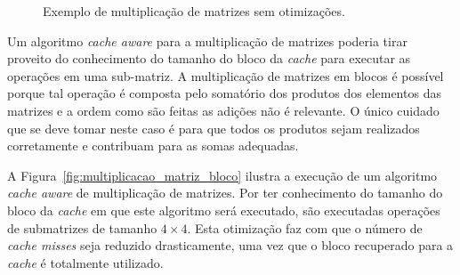 \begin{figure}[hb]
    \centering
    \caption[Exemplo de multiplicação de matrizes]{Exemplo de multiplicação de matrizes sem otimizações.}
    \label{fig:multiplicacao_matriz}
\end{figure}


Um algoritmo \textit{cache aware} para a multiplicação de matrizes poderia tirar proveito do conhecimento do tamanho do bloco da \textit{cache} para executar as operações em uma sub-matriz.
A multiplicação de matrizes em blocos é possível porque tal operação é composta pelo somatório dos produtos dos elementos das matrizes e a ordem como são feitas as adições não é relevante.
O único cuidado que se deve tomar neste caso é para que todos os produtos sejam realizados corretamente e contribuam para as somas adequadas.



A Figura~\ref{fig:multiplicacao_matriz_bloco} ilustra a execução de um algoritmo \textit{cache aware} de multiplicação de matrizes. Por ter conhecimento do tamanho do bloco da \textit{cache} em que este algoritmo será executado, são executadas operações de submatrizes de tamanho $4 \times 4$. Esta otimização faz com que o número de \textit{cache misses} seja reduzido drasticamente, uma vez que o bloco recuperado para a \textit{cache} é totalmente utilizado.

